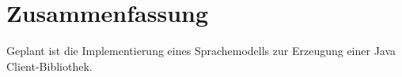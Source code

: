 \chapter{Zusammenfassung}
\label{chap:summary}



\label{sec:conclusion}




\label{sec:prospect}

Geplant ist die Implementierung eines Sprachemodells zur Erzeugung einer Java Client-Bibliothek.
